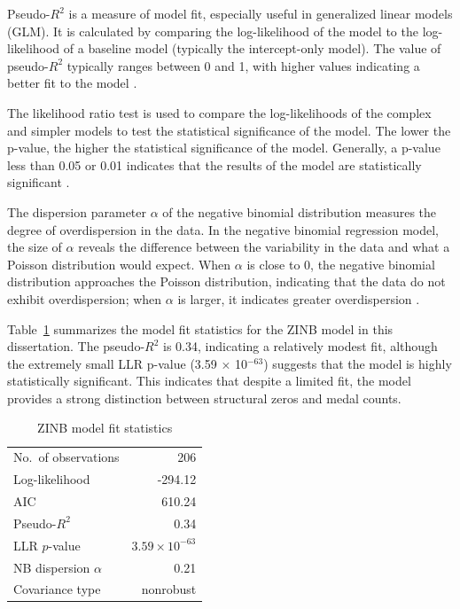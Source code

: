 \documentclass[11pt,twoside]{article}
\numberwithin{Theorem}{section}
\numberwithin{Definition}{section}
\numberwithin{Lemma}{section}
\numberwithin{Algorithm}{section}
\numberwithin{equation}{section}
\begin{document}
Pseudo-\( R^2 \) is a measure of model fit, especially useful in generalized linear models (GLM). It is calculated by comparing the log-likelihood of the model to the log-likelihood of a baseline model (typically the intercept-only model). The value of pseudo-\( R^2 \) typically ranges between 0 and 1, with higher values indicating a better fit to the model \cite{McFadden1974}.

The likelihood ratio test is used to compare the log-likelihoods of the complex and simpler models to test the statistical significance of the model. The lower the p-value, the higher the statistical significance of the model. Generally, a p-value less than 0.05 or 0.01 indicates that the results of the model are statistically significant \cite{Wilks1938}.

The dispersion parameter \(\alpha\) of the negative binomial distribution measures the degree of overdispersion in the data. In the negative binomial regression model, the size of \(\alpha\) reveals the difference between the variability in the data and what a Poisson distribution would expect. When \(\alpha\) is close to 0, the negative binomial distribution approaches the Poisson distribution, indicating that the data do not exhibit overdispersion; when \(\alpha\) is larger, it indicates greater overdispersion \cite{Nelder1972}.


Table~\ref{tab:zinb_fit} summarizes the model fit statistics for the ZINB model in this dissertation. The pseudo-$R^2$ is 0.34, indicating a relatively modest fit, although the extremely small LLR p-value (3.59 × 10$^{-63}$) suggests that the model is highly statistically significant. This indicates that despite a limited fit, the model provides a strong distinction between structural zeros and medal counts.

\begin{table}[H]
\centering
\caption{ZINB model fit statistics}
\label{tab:zinb_fit}
\begin{tabular}{l r}
\toprule
No.\ of observations & 206 \\
Log-likelihood & -294.12 \\
AIC & 610.24 \\
Pseudo-$R^2$ & 0.34 \\
LLR $p$-value & $3.59\times 10^{-63}$ \\
NB dispersion $\alpha$ & 0.21 \\
Covariance type & nonrobust \\
\bottomrule
\end{tabular}
\end{table}
\end{document}
